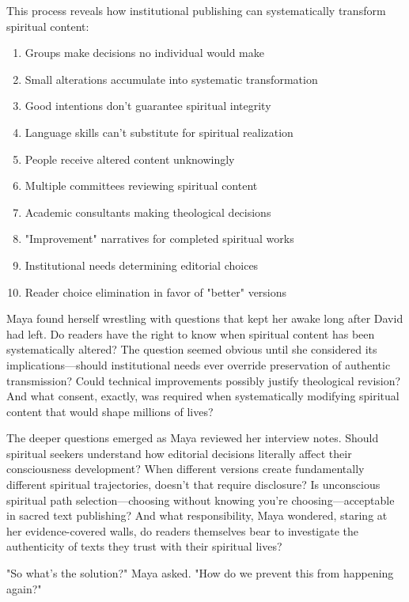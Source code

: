 \documentclass[12pt,twoside]{book}
\begin{document}
This process reveals how institutional publishing can systematically transform spiritual content:

\begin{enumerate}
\item Groups make decisions no individual would make
\item Small alterations accumulate into systematic transformation
\item Good intentions don't guarantee spiritual integrity
\item Language skills can't substitute for spiritual realization
\item People receive altered content unknowingly

\item Multiple committees reviewing spiritual content
\item Academic consultants making theological decisions
\item "Improvement" narratives for completed spiritual works
\item Institutional needs determining editorial choices
\item Reader choice elimination in favor of "better" versions
\end{enumerate}

Maya found herself wrestling with questions that kept her awake long after David had left. Do readers have the right to know when spiritual content has been systematically altered? The question seemed obvious until she considered its implications—should institutional needs ever override preservation of authentic transmission? Could technical improvements possibly justify theological revision? And what consent, exactly, was required when systematically modifying spiritual content that would shape millions of lives?

The deeper questions emerged as Maya reviewed her interview notes. Should spiritual seekers understand how editorial decisions literally affect their consciousness development? When different versions create fundamentally different spiritual trajectories, doesn't that require disclosure? Is unconscious spiritual path selection—choosing without knowing you're choosing—acceptable in sacred text publishing? And what responsibility, Maya wondered, staring at her evidence-covered walls, do readers themselves bear to investigate the authenticity of texts they trust with their spiritual lives?

"So what's the solution?" Maya asked. "How do we prevent this from happening again?"
\end{document}
